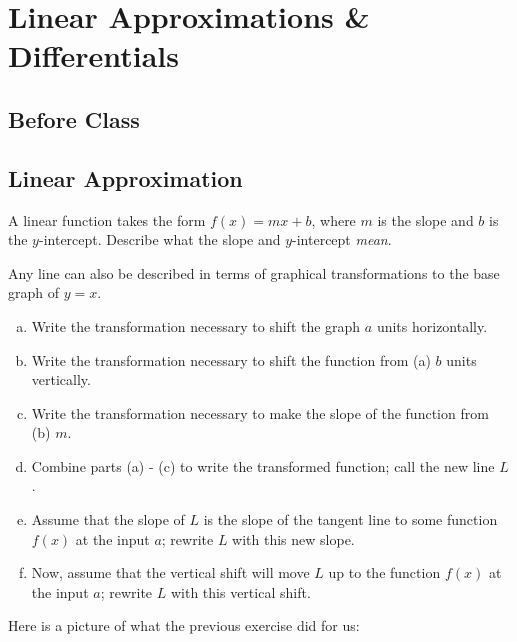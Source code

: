 \documentclass[notes]{subfiles}
\begin{document}
	\fancyhead[LO,RE]{\bfseries \currentname}
	\fancyfoot[C]{{}}
	\fancyfoot[RO,LE]{\large \thepage}	%
	
\section*{Linear Approximations \& Differentials}\label{cs29}
	\subsection*{Before Class}
	\subsection*{Linear Approximation}
		\begin{ex}
			A linear function takes the form $f(x) = mx + b$, where $m$ is the slope and $b$ is the $y$-intercept.  Describe what the slope and $y$-intercept \emph{mean}.
		\end{ex}
			
		\begin{ex}
			Any line can also be described in terms of graphical transformations to the base graph of $y = x$.
			\begin{enumerate}[(a)]
				\item Write the transformation necessary to shift the graph $a$ units horizontally.
					
				\item Write the transformation necessary to shift the function from (a) $b$ units vertically.
					
				\item Write the transformation necessary to make the slope of the function from (b) $m$.
					
				\item Combine parts (a) - (c) to write the transformed function; call the new line $L$.
					\newpage
					
				\item Assume that the slope of $L$ is the slope of the tangent line to some function $f(x)$ at the input $a$; rewrite $L$ with this new slope.
					
				\item Now, assume that the vertical shift will move $L$ up to the function $f(x)$ at the input $a$; rewrite $L$ with this vertical shift.
			\end{enumerate}
		\end{ex}
		Here is a picture of what the previous exercise did for us:
\end{document}
